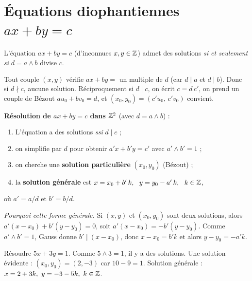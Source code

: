 \section{Équations diophantiennes $ax+by=c$}

\begin{theoreme}
L'équation $ax+by=c$ (d'inconnues $x,y\in\mathbb{Z}$) admet des solutions \emph{si et seulement si}
$d=a\wedge b$ divise $c$.
\end{theoreme}

\begin{remarque}
Tout couple $(x,y)$ vérifie $ax+by=$ un multiple de $d$ (car $d\mid a$ et $d\mid b$). Donc si
$d\nmid c$, aucune solution. Réciproquement si $d\mid c$, on écrit $c=d\,c'$, on prend un
couple de Bézout $au_0+bv_0=d$, et $(x_0,y_0)=(c'u_0,\,c'v_0)$ convient.
\end{remarque}

\begin{aretenir}
\textbf{Résolution de $ax+by=c$ dans $\mathbb{Z}^2$} (avec $d=a\wedge b$) :
\begin{enumerate}
\item L'équation a des solutions \emph{ssi} $d\mid c$ ;
\item on simplifie par $d$ pour obtenir $a'x+b'y=c'$ avec $a'\wedge b'=1$ ;
\item on cherche une \textbf{solution particulière} $(x_0,y_0)$ (Bézout) ;
\item la \textbf{solution générale} est $x=x_0+b'\,k,\ \ y=y_0-a'\,k,\ \ k\in\Z$,
\end{enumerate}
où $a'=a/d$ et $b'=b/d$.
\end{aretenir}

\begin{remarque}
\textit{Pourquoi cette forme générale.} Si $(x,y)$ et $(x_0,y_0)$ sont deux solutions, alors
$a'(x-x_0)+b'(y-y_0)=0$, soit $a'(x-x_0)=-b'(y-y_0)$. Comme $a'\wedge b'=1$, Gauss donne
$b'\mid(x-x_0)$, donc $x-x_0=b'k$ et alors $y-y_0=-a'k$.
\end{remarque}

\begin{exemple}
Résoudre $5x+3y=1$. Comme $5\wedge3=1$, il y a des solutions. Une solution évidente :
$(x_0,y_0)=(2,-3)$ car $10-9=1$. Solution générale : $x=2+3k,\ y=-3-5k,\ k\in\Z$.
\end{exemple}

